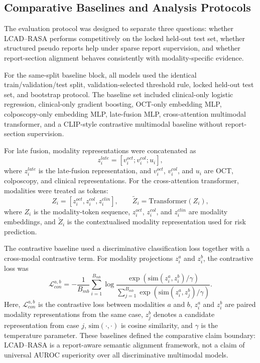 \subsection{Comparative Baselines and Analysis Protocols}
\label{subsec:methods_baselines_protocols}

The evaluation protocol was designed to separate three questions: whether LCAD--RASA performs competitively on the locked held-out test set, whether structured pseudo reports help under sparse report supervision, and whether report-section alignment behaves consistently with modality-specific evidence.

For the same-split baseline block, all models used the identical train/validation/test split, validation-selected threshold rule, locked held-out test set, and bootstrap protocol. The baseline set included clinical-only logistic regression, clinical-only gradient boosting, OCT-only embedding MLP, colposcopy-only embedding MLP, late-fusion MLP, cross-attention multimodal transformer, and a CLIP-style contrastive multimodal baseline without report-section supervision.

For late fusion, modality representations were concatenated as
\begin{equation}
z_i^{late}=[v_i^{oct};v_i^{col};u_i],
\label{eq:late_fusion}
\end{equation}
where \(z_i^{late}\) is the late-fusion representation, and \(v_i^{oct}\), \(v_i^{col}\), and \(u_i\) are OCT, colposcopy, and clinical representations. For the cross-attention transformer, modalities were treated as tokens:
\begin{equation}
Z_i=[z_i^{oct},z_i^{col},z_i^{clin}],
\qquad
\tilde{Z}_i=\mathrm{Transformer}(Z_i),
\label{eq:cross_attention}
\end{equation}
where \(Z_i\) is the modality-token sequence, \(z_i^{oct}\), \(z_i^{col}\), and \(z_i^{clin}\) are modality embeddings, and \(\tilde{Z}_i\) is the contextualised modality representation used for risk prediction.

The contrastive baseline used a discriminative classification loss together with a cross-modal contrastive term. For modality projections \(z_i^a\) and \(z_i^b\), the contrastive loss was
\begin{equation}
\mathcal{L}_{con}^{a,b}
=
-\frac{1}{B_{mb}}\sum_{i=1}^{B_{mb}}
\log
\frac{\exp(\mathrm{sim}(z_i^{a},z_i^{b})/\gamma)}
{\sum_{j=1}^{B_{mb}}\exp(\mathrm{sim}(z_i^{a},z_j^{b})/\gamma)}.
\label{eq:contrastive_loss}
\end{equation}
Here, \(\mathcal{L}_{con}^{a,b}\) is the contrastive loss between modalities \(a\) and \(b\), \(z_i^a\) and \(z_i^b\) are paired modality representations from the same case, \(z_j^b\) denotes a candidate representation from case \(j\), \(\mathrm{sim}(\cdot,\cdot)\) is cosine similarity, and \(\gamma\) is the temperature parameter. These baselines defined the comparative claim boundary: LCAD--RASA is a report-aware semantic alignment framework, not a claim of universal AUROC superiority over all discriminative multimodal models.

